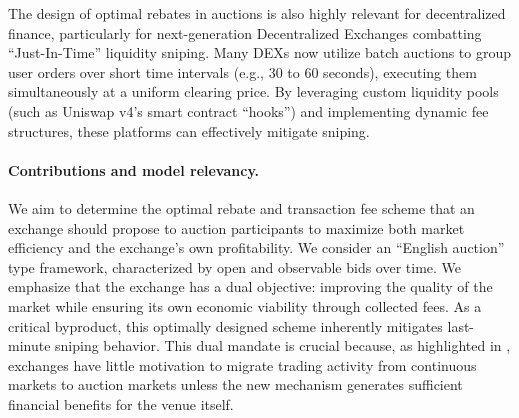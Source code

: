 \documentclass[12pt]{article}
\begin{document}
The design of optimal rebates in auctions is also highly relevant for decentralized finance, particularly for next-generation Decentralized Exchanges combatting ``Just-In-Time'' liquidity sniping. Many DEXs now utilize batch auctions to group user orders over short time intervals (e.g., 30 to 60 seconds), executing them simultaneously at a uniform clearing price. By leveraging custom liquidity pools (such as Uniswap v4's smart contract ``hooks'') and implementing dynamic fee structures, these platforms can effectively mitigate sniping.

\paragraph{Contributions and model relevancy.}
We aim to determine the optimal rebate and transaction fee scheme that an exchange should propose to auction participants to maximize both market efficiency and the exchange's own profitability. We consider an ``English auction'' type framework, characterized by open and observable bids over time. We emphasize that the exchange has a dual objective: improving the quality of the market while ensuring its own economic viability through collected fees. As a critical byproduct, this optimally designed scheme inherently mitigates last-minute sniping behavior. This dual mandate is crucial because, as highlighted in \cite{budish2024stock_exchange}, exchanges have little motivation to migrate trading activity from continuous markets to auction markets unless the new mechanism generates sufficient financial benefits for the venue itself. 
\end{document}
